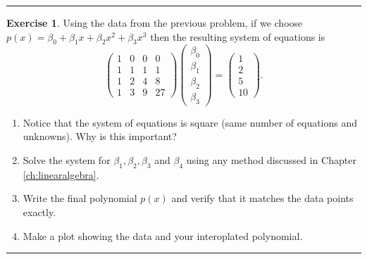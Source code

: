 \documentclass[
]{book}
\providecommand{\tightlist}{%
  \setlength{\itemsep}{0pt}\setlength{\parskip}{0pt}}
\theoremstyle{definition}
\theoremstyle{definition}
\theoremstyle{definition}
\newtheorem{exercise}{Exercise}[chapter]
\theoremstyle{remark}
\begin{document}
\begin{center}\rule{0.5\linewidth}{0.5pt}\end{center}

\begin{exercise}
\protect\hypertarget{exr:unnamed-chunk-839}{}{\label{exr:unnamed-chunk-839} }Using the data from the previous problem, if we choose \(p(x) = \beta_0 + \beta_1 x + \beta_2 x^2 + \beta_3 x^3\) then the resulting system of equations is
\[\begin{pmatrix}  1 & 0 & 0 & 0 \\
                    1 & 1 & 1 & 1 \\
                    1 & 2 & 4 & 8 \\
                    1 & 3 & 9 & 27 \end{pmatrix} \begin{pmatrix} \beta_0 \\ \beta_1 \\
                    \beta_2 \\ \beta_3 \end{pmatrix} = \begin{pmatrix} 1 \\ 2 \\ 5 \\ 10
            \end{pmatrix}.\]

\begin{enumerate}
\def\labelenumi{\alph{enumi}.}
\tightlist
\item
  Notice that the system of equations is square (same number of equations and unknowns). Why is this important?
\item
  Solve the system for \(\beta_1, \beta_2, \beta_3\) and \(\beta_4\) using any method discussed in Chapter \ref{ch:linearalgebra}.
\item
  Write the final polynomial \(p(x)\) and verify that it matches the data points exactly.\\
\item
  Make a plot showing the data and your interoplated polynomial.
\end{enumerate}
\end{exercise}

\begin{center}\rule{0.5\linewidth}{0.5pt}\end{center}
\end{document}
